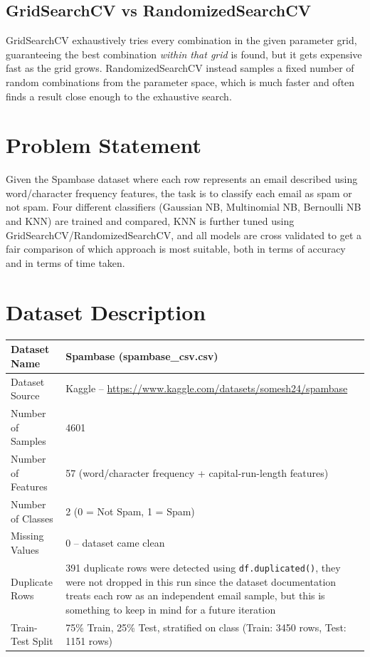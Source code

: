 \documentclass[12pt,a4paper]{article}
\begin{document}
\subsection*{GridSearchCV vs RandomizedSearchCV}
GridSearchCV exhaustively tries every combination in the given parameter grid, guaranteeing the best combination \textit{within that grid} is found, but it gets expensive fast as the grid grows. RandomizedSearchCV instead samples a fixed number of random combinations from the parameter space, which is much faster and often finds a result close enough to the exhaustive search.

\section{Problem Statement}
Given the Spambase dataset where each row represents an email described using word/character frequency features, the task is to classify each email as spam or not spam. Four different classifiers (Gaussian NB, Multinomial NB, Bernoulli NB and KNN) are trained and compared, KNN is further tuned using GridSearchCV/RandomizedSearchCV, and all models are cross validated to get a fair comparison of which approach is most suitable, both in terms of accuracy and in terms of time taken.

\section{Dataset Description}
\begin{longtable}{|p{6cm}|p{8cm}|}
\hline
Dataset Name & Spambase (spambase\_csv.csv) \\ \hline
Dataset Source & Kaggle -- \url{https://www.kaggle.com/datasets/somesh24/spambase} \\ \hline
Number of Samples & 4601 \\ \hline
Number of Features & 57 (word/character frequency + capital-run-length features) \\ \hline
Number of Classes & 2 (0 = Not Spam, 1 = Spam) \\ \hline
Missing Values & 0 -- dataset came clean \\ \hline
Duplicate Rows & 391 duplicate rows were detected using \texttt{df.duplicated()}, they were not dropped in this run since the dataset documentation treats each row as an independent email sample, but this is something to keep in mind for a future iteration \\ \hline
Train-Test Split & 75\% Train, 25\% Test, stratified on class (Train: 3450 rows, Test: 1151 rows) \\ \hline
\end{longtable}
\end{document}
